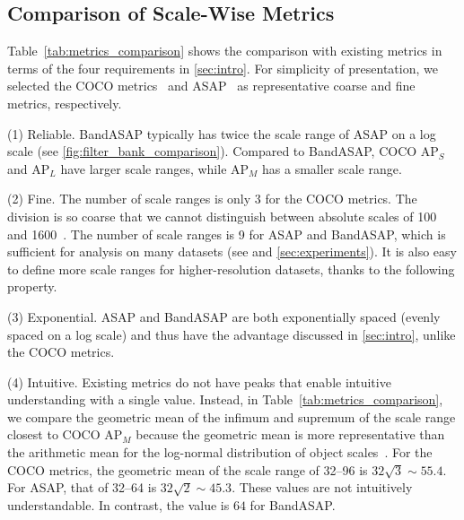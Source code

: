\documentclass{mva_style}
\newcommand{\APS}{AP$_\textit{S}$\xspace}
\newcommand{\APM}{AP$_\textit{M}$\xspace}
\newcommand{\APL}{AP$_\textit{L}$\xspace}
\begin{document}
\subsection{Comparison of Scale-Wise Metrics}

Table~\ref{tab:metrics_comparison} shows the comparison with existing metrics
in terms of the four requirements in \cref{sec:intro}.
For simplicity of presentation,
we selected the COCO metrics~\cite{COCO_ECCV2014, cocoapi} and ASAP~\cite{USB_Shinya_BMVC2022}
as representative coarse and fine metrics, respectively.

\noindent
(1) Reliable.
BandASAP typically has twice the scale range of ASAP on a log scale (see \cref{fig:filter_bank_comparison}).
Compared to BandASAP, COCO \APS and \APL have larger scale ranges,
while \APM has a smaller scale range.

\noindent
(2) Fine.
The number of scale ranges is only 3 for the COCO metrics.
The division is so coarse that we cannot distinguish between absolute scales of 100 and 1600~\cite{USB_Shinya_BMVC2022}.
The number of scale ranges is 9 for ASAP and BandASAP,
which is sufficient for analysis on many datasets (see \cite{USB_Shinya_BMVC2022} and \cref{sec:experiments}).
It is also easy to define more scale ranges for higher-resolution datasets,
thanks to the following property.

\noindent
(3) Exponential.
ASAP and BandASAP are both exponentially spaced (evenly spaced on a log scale)
and thus have the advantage discussed in \cref{sec:intro},
unlike the COCO metrics.

\noindent
(4) Intuitive.
Existing metrics do not have peaks that enable intuitive understanding with a single value.
Instead, in Table~\ref{tab:metrics_comparison},
we compare the geometric mean of the infimum and supremum of the scale range closest to COCO \APM
because the geometric mean is more representative than the arithmetic mean for the log-normal distribution of object scales~\cite{Caltech_PAMI2012}.
For the COCO metrics, the geometric mean of the scale range of 32--96 is $32\sqrt{3} \sim 55.4$.
For ASAP, that of 32--64 is $32\sqrt{2} \sim 45.3$.
These values are not intuitively understandable.
In contrast, the value is $64$ for BandASAP.
\end{document}
